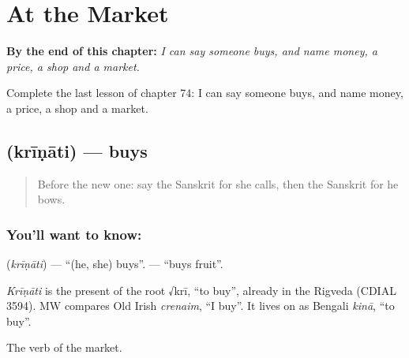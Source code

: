
\chapter{At the Market}
\label{ch:sa-at-the-market}

\begin{chapteropening}
\textbf{By the end of this chapter:} \emph{I can say someone buys, and name money, a price, a shop and a market.}

Complete the last lesson of chapter 74: I can say someone buys, and name money, a price, a shop and a market.
\end{chapteropening}

\section[\texorpdfstring{\sk{क्रीणाति} (krīṇāti)}{क्रीणाति (krīṇāti)}]{ (krīṇāti) — buys}

\label{lesson:SA-C74-buys}



\begin{quote}
Before the new one: say the Sanskrit for she calls, then the Sanskrit for he bows.
\end{quote}

\subsection*{You'll want to know: }
\textbf{} (\emph{krīṇāti}) — \textquotedblleft{}(he, she) buys\textquotedblright{}. \textbf{ } — \textquotedblleft{}buys fruit\textquotedblright{}.

\begin{cousinweb}
\emph{Krīṇāti} is the present of the root √krī, \textquotedblleft{}to buy\textquotedblright{}, already in the Rigveda (CDIAL 3594). MW compares Old Irish \emph{crenaim}, \textquotedblleft{}I buy\textquotedblright{}. It lives on as Bengali \emph{kinā}, \textquotedblleft{}to buy\textquotedblright{}.
\end{cousinweb}

\begin{grammarlens}[title={What you've built}]
The verb of the market.
\end{grammarlens}

